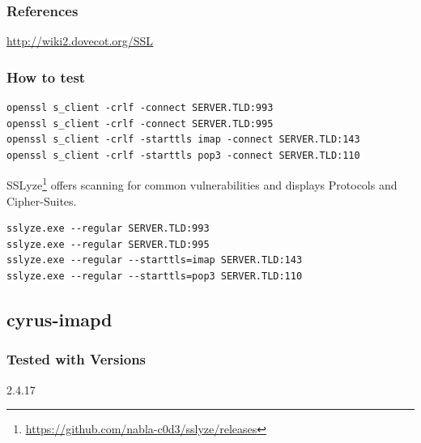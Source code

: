 

\subsubsection{References}
\begin{itemize*}
  \item \url{http://wiki2.dovecot.org/SSL}
\end{itemize*}


\subsubsection{How to test}
\begin{lstlisting}
openssl s_client -crlf -connect SERVER.TLD:993
openssl s_client -crlf -connect SERVER.TLD:995
openssl s_client -crlf -starttls imap -connect SERVER.TLD:143
openssl s_client -crlf -starttls pop3 -connect SERVER.TLD:110
\end{lstlisting}

SSLyze\footnote{\url{https://github.com/nabla-c0d3/sslyze/releases}} offers scanning for common vulnerabilities and displays Protocols and Cipher-Suites.
\begin{lstlisting}
sslyze.exe --regular SERVER.TLD:993
sslyze.exe --regular SERVER.TLD:995
sslyze.exe --regular --starttls=imap SERVER.TLD:143
sslyze.exe --regular --starttls=pop3 SERVER.TLD:110
\end{lstlisting}



\subsection{cyrus-imapd}
\subsubsection{Tested with Versions}
\begin{itemize*}
  \item 2.4.17
\end{itemize*}

